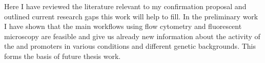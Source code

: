 \begin{enumerate}
\begin{itemize}
    \end{itemize}

\end{enumerate}

Here I have reviewed the literature relevant to my confirmation proposal and outlined current research gaps this work will help to fill.
In the preliminary work I have shown that the main workflows using flow cytometry and fluorescent microscopy are feasible and give us already new information about the activity of the  and  promoters in various conditions and different genetic backgrounds.
This forms the basis of future thesis work.

\cleardoublepage%

\shorthandon{-}
